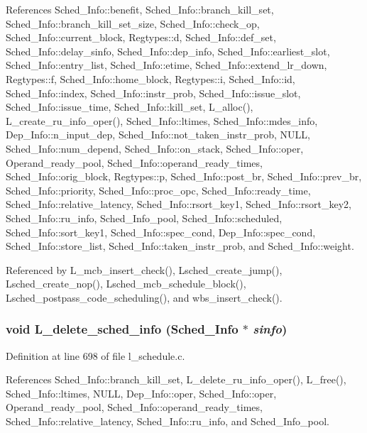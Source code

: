 References Sched\_\-Info::benefit, Sched\_\-Info::branch\_\-kill\_\-set, Sched\_\-Info::branch\_\-kill\_\-set\_\-size, Sched\_\-Info::check\_\-op, Sched\_\-Info::current\_\-block, Regtypes::d, Sched\_\-Info::def\_\-set, Sched\_\-Info::delay\_\-sinfo, Sched\_\-Info::dep\_\-info, Sched\_\-Info::earliest\_\-slot, Sched\_\-Info::entry\_\-list, Sched\_\-Info::etime, Sched\_\-Info::extend\_\-lr\_\-down, Regtypes::f, Sched\_\-Info::home\_\-block, Regtypes::i, Sched\_\-Info::id, Sched\_\-Info::index, Sched\_\-Info::instr\_\-prob, Sched\_\-Info::issue\_\-slot, Sched\_\-Info::issue\_\-time, Sched\_\-Info::kill\_\-set, L\_\-alloc(), L\_\-create\_\-ru\_\-info\_\-oper(), Sched\_\-Info::ltimes, Sched\_\-Info::mdes\_\-info, Dep\_\-Info::n\_\-input\_\-dep, Sched\_\-Info::not\_\-taken\_\-instr\_\-prob, NULL, Sched\_\-Info::num\_\-depend, Sched\_\-Info::on\_\-stack, Sched\_\-Info::oper, Operand\_\-ready\_\-pool, Sched\_\-Info::operand\_\-ready\_\-times, Sched\_\-Info::orig\_\-block, Regtypes::p, Sched\_\-Info::post\_\-br, Sched\_\-Info::prev\_\-br, Sched\_\-Info::priority, Sched\_\-Info::proc\_\-opc, Sched\_\-Info::ready\_\-time, Sched\_\-Info::relative\_\-latency, Sched\_\-Info::rsort\_\-key1, Sched\_\-Info::rsort\_\-key2, Sched\_\-Info::ru\_\-info, Sched\_\-Info\_\-pool, Sched\_\-Info::scheduled, Sched\_\-Info::sort\_\-key1, Sched\_\-Info::spec\_\-cond, Dep\_\-Info::spec\_\-cond, Sched\_\-Info::store\_\-list, Sched\_\-Info::taken\_\-instr\_\-prob, and Sched\_\-Info::weight.

Referenced by L\_\-mcb\_\-insert\_\-check(), Lsched\_\-create\_\-jump(), Lsched\_\-create\_\-nop(), Lsched\_\-mcb\_\-schedule\_\-block(), Lsched\_\-postpass\_\-code\_\-scheduling(), and wbs\_\-insert\_\-check().
\subsubsection{\setlength{\rightskip}{0pt plus 5cm}void L\_\-delete\_\-sched\_\-info (\bf{Sched\_\-Info} $\ast$ {\em sinfo})}\label{l__schedule_8c_8a1f800cff6d1e8b40ae9b11667c05dd}




Definition at line 698 of file l\_\-schedule.c.

References Sched\_\-Info::branch\_\-kill\_\-set, L\_\-delete\_\-ru\_\-info\_\-oper(), L\_\-free(), Sched\_\-Info::ltimes, NULL, Dep\_\-Info::oper, Sched\_\-Info::oper, Operand\_\-ready\_\-pool, Sched\_\-Info::operand\_\-ready\_\-times, Sched\_\-Info::relative\_\-latency, Sched\_\-Info::ru\_\-info, and Sched\_\-Info\_\-pool.

